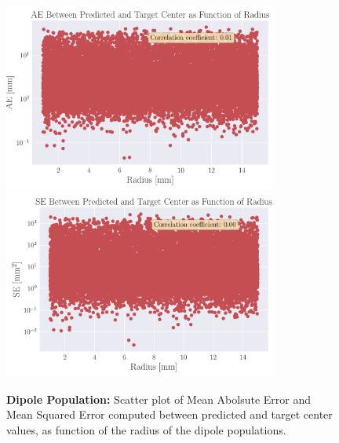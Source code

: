 \documentclass[a4paper, UKenglish, 11pt]{uiomaster}
\begin{document}
\begin{figure}
  \hspace*{-3cm} %
  \includegraphics[width=9cm]{figures/NN_area/mae_area.pdf}
  \includegraphics[width=9cm]{figures/NN_area/mse_area.pdf}
  \caption{\textbf{Dipole Population:}
  Scatter plot of Mean Abolsute Error and Mean Squared Error computed between predicted and target center values, as function of the radius of the dipole populations.}
  \label{fig:area_errors}
\end{figure}
\end{document}
